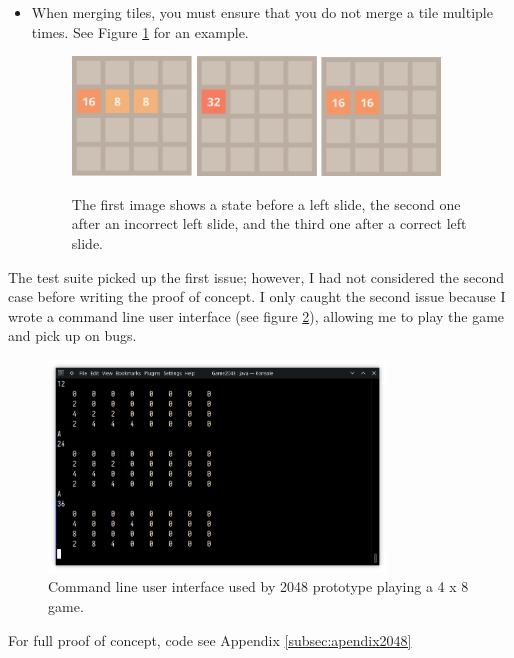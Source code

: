 \documentclass{article}
\begin{document}
\begin{itemize}
    \item When merging tiles, you must ensure that you do not merge a tile multiple times. See Figure \ref{fig:mergebug} for an example.
    \begin{figure}
        \centering
        \includegraphics[width=0.3\textwidth]{2048_merge.png}
        \includegraphics[width=0.3\textwidth]{2048_merge3.png}
        \includegraphics[width=0.3\textwidth]{2048_merge2.png}
        \caption{The first image shows a state before a left slide, the second one after an incorrect left slide, and the third one after a correct left slide.}
        \label{fig:mergebug}
    \end{figure}
\end{itemize}
The test suite picked up the first issue; however, I had not considered the second case before writing the proof of concept. I only caught the second issue because I wrote a command line user interface (see figure \ref{fig:2048_cli}), allowing me to play the game and pick up on bugs. 
    \begin{figure}
        \centering
        \includegraphics[width=0.8\textwidth]{Screenshot_20221201_231121.png}
        \caption{Command line user interface used by 2048 prototype playing a 4 x 8 game.}
        \label{fig:2048_cli}
    \end{figure}
    For full proof of concept, code see Appendix \ref{subsec:apendix2048}
\end{document}
